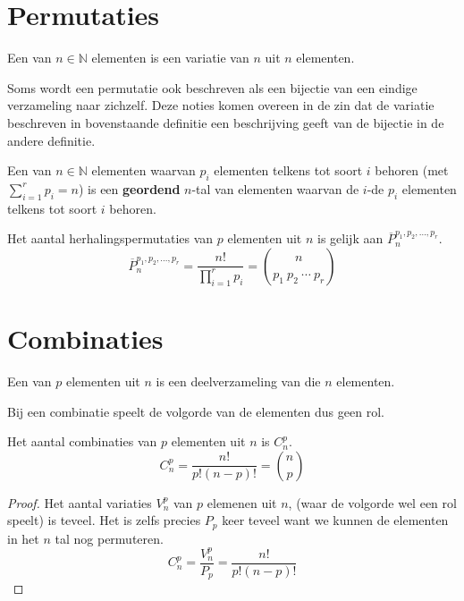 \documentclass[main.tex]{subfiles}
\begin{document}
\section{Permutaties}
\label{sec:permutaties}

\begin{de}
  Een  van $n\in \mathbb{N}$ elementen is een variatie van $n$ uit $n$ elementen. 
\end{de}

\begin{opm}
  Soms wordt een permutatie ook beschreven als een bijectie van een eindige verzameling naar zichzelf.
  Deze noties komen overeen in de zin dat de variatie beschreven in bovenstaande definitie een beschrijving geeft van de bijectie in de andere definitie.
\end{opm}

\begin{de}
  Een  van $n\in \mathbb{N}$ elementen waarvan $p_{i}$ elementen telkens tot soort $i$ behoren (met $\sum_{i=1}^{r} p_{i} = n$) is een \textbf{geordend} $n$-tal van elementen waarvan de $i$-de $p_{i}$ elementen telkens tot soort $i$ behoren.
\end{de}

\begin{st}
  Het aantal herhalingspermutaties van $p$ elementen uit $n$ is gelijk aan $\overline{P}_{n}^{p_{1},p_{2},\dotsc,p_{r}}$.
  \[ \overline{P}_{n}^{p_{1},p_{2},\dotsc,p_{r}} = \frac{n!}{\prod_{i=1}^{r}p_{i}} = \binom{n}{p_{1}\ p_{2}\ \dotsb\ p_{r}} \]
\end{st}

\section{Combinaties}
\label{sec:combinaties}

\begin{de}
  Een  van $p$ elementen uit $n$ is een deelverzameling van die $n$ elementen.
\end{de}

\begin{opm}
  Bij een combinatie speelt de volgorde van de elementen dus geen rol.
\end{opm}

\begin{st}
  Het aantal combinaties van $p$ elementen uit $n$ is $C_{n}^{p}$.
  \[ C_{n}^{p} = \frac{n!}{p!(n-p)!} = \binom{n}{p} \]

  \begin{proof}
    Het aantal variaties $V_{n}^{p}$ van $p$ elemenen uit $n$, (waar de volgorde wel een rol speelt) is teveel.
    Het is zelfs precies $P_{p}$ keer teveel want we kunnen de elementen in het $n$ tal nog permuteren.
    \[ C_{n}^{p} = \frac{V_{n}^{p}}{P_{p}} = \frac{n!}{p!(n-p)!} \]
  \end{proof}
\end{st}
\end{document}
